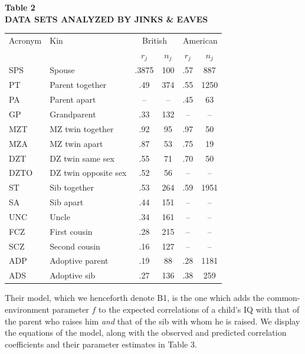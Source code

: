 ﻿\documentclass[12pt]{article}
\begin{document}
\begin{center}
\textbf{Table 2}\\
\textbf{DATA SETS ANALYZED BY JINKS \& EAVES}
\end{center}
\begin{center}
\begin{tabular}{l l c c c c}
\hline
Acronym & Kin & \multicolumn{2}{c}{British} & \multicolumn{2}{c}{American} \\
 & & $r_j$ & $n_j$ & $r_j$ & $n_j$ \\
\hline
SPS & Spouse & .3875 & 100 & .57 & 887 \\
PT & Parent together & .49 & 374 & .55 & 1250 \\
PA & Parent apart & -- & -- & .45 & 63 \\
GP & Grandparent & .33 & 132 & -- & -- \\
MZT & MZ twin together & .92 & 95 & .97 & 50 \\
MZA & MZ twin apart & .87 & 53 & .75 & 19 \\
DZT & DZ twin same sex & .55 & 71 & .70 & 50 \\
DZTO & DZ twin opposite sex & .52 & 56 & -- & -- \\
ST & Sib together & .53 & 264 & .59 & 1951 \\
SA & Sib apart & .44 & 151 & -- & -- \\
UNC & Uncle & .34 & 161 & -- & -- \\
FCZ & First cousin & .28 & 215 & -- & -- \\
SCZ & Second cousin & .16 & 127 & -- & -- \\
ADP & Adoptive parent & .19 & 88 & .28 & 1181 \\
ADS & Adoptive sib & .27 & 136 & .38 & 259 \\
\hline
\end{tabular}
\end{center}

Their model, which we henceforth denote B1, is the one which adds the common-environment parameter $f$ to the expected correlations of a child's IQ with that of the parent who raises him \emph{and} that of the sib with whom he is raised. We display the equations of the model, along with the observed and predicted correlation coefficients and their parameter estimates in Table 3.
\end{document}
